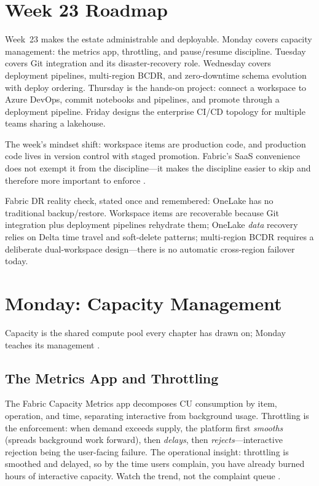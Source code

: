 \section{Week 23 Roadmap}
Week~23 makes the estate administrable and deployable. Monday covers capacity management: the metrics app, throttling, and pause/resume discipline. Tuesday covers Git integration and its disaster-recovery role. Wednesday covers deployment pipelines, multi-region BCDR, and zero-downtime schema evolution with deploy ordering. Thursday is the hands-on project: connect a workspace to Azure DevOps, commit notebooks and pipelines, and promote through a deployment pipeline. Friday designs the enterprise CI/CD topology for multiple teams sharing a lakehouse.

The week's mindset shift: workspace items are production code, and production code lives in version control with staged promotion. Fabric's SaaS convenience does not exempt it from the discipline---it makes the discipline easier to skip and therefore more important to enforce \cite{microsoftFabricGitIntegration,microsoftFabricDeploymentPipelines}.

\begin{notebox}
Fabric DR reality check, stated once and remembered: OneLake has no traditional backup/restore. Workspace items are recoverable because Git integration plus deployment pipelines rehydrate them; OneLake \emph{data} recovery relies on Delta time travel and soft-delete patterns; multi-region BCDR requires a deliberate dual-workspace design---there is no automatic cross-region failover today.
\end{notebox}

\section{Monday: Capacity Management}
Capacity is the shared compute pool every chapter has drawn on; Monday teaches its management \cite{microsoftFabricCapacity,microsoftFabricMetricsApp}.

\subsection{The Metrics App and Throttling}
The Fabric Capacity Metrics app decomposes CU consumption by item, operation, and time, separating interactive from background usage. Throttling is the enforcement: when demand exceeds supply, the platform first \emph{smooths} (spreads background work forward), then \emph{delays}, then \emph{rejects}---interactive rejection being the user-facing failure. The operational insight: throttling is smoothed and delayed, so by the time users complain, you have already burned hours of interactive capacity. Watch the trend, not the complaint queue \cite{microsoftFabricMetricsApp}.

